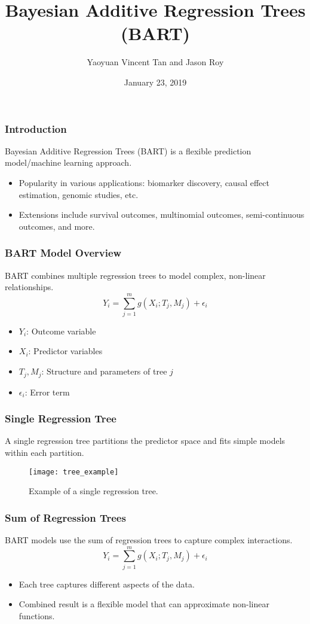 \documentclass{beamer}
\title{Bayesian Additive Regression Trees (BART)}
\author{Yaoyuan Vincent Tan and Jason Roy}
\date{January 23, 2019}
\begin{document}
\frame{\titlepage}

\begin{frame}
\frametitle{Introduction}
Bayesian Additive Regression Trees (BART) is a flexible prediction model/machine learning approach.
\begin{itemize}
    \item Popularity in various applications: biomarker discovery, causal effect estimation, genomic studies, etc.
    \item Extensions include survival outcomes, multinomial outcomes, semi-continuous outcomes, and more.
\end{itemize}
\end{frame}

\begin{frame}
\frametitle{BART Model Overview}
BART combines multiple regression trees to model complex, non-linear relationships.
\begin{equation}
Y_i = \sum_{j=1}^{m} g(X_i; T_j, M_j) + \epsilon_i
\end{equation}
\begin{itemize}
    \item \(Y_i\): Outcome variable
    \item \(X_i\): Predictor variables
    \item \(T_j, M_j\): Structure and parameters of tree \(j\)
    \item \(\epsilon_i\): Error term
\end{itemize}
\end{frame}

\begin{frame}
\frametitle{Single Regression Tree}
A single regression tree partitions the predictor space and fits simple models within each partition.
\begin{figure}
    \centering
    \texttt{[image: tree\_example]}
    \caption{Example of a single regression tree.}
\end{figure}
\end{frame}

\begin{frame}
\frametitle{Sum of Regression Trees}
BART models use the sum of regression trees to capture complex interactions.
\begin{equation}
Y_i = \sum_{j=1}^{m} g(X_i; T_j, M_j) + \epsilon_i
\end{equation}
\begin{itemize}
    \item Each tree captures different aspects of the data.
    \item Combined result is a flexible model that can approximate non-linear functions.
\end{itemize}
\end{frame}
\end{document}
